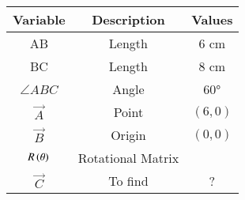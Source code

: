 
\begin{tabular}[12pt]{ |c| c| c|}
    \hline
    \textbf{Variable} & \textbf{Description} & \textbf{Values} \\ 
    \hline
    AB & Length & 6 cm \\
    \hline
    BC & Length & 8 cm \\
    \hline
    $\angle ABC$ & Angle & \ang{60}\\
    \hline 
    $\vec{A}$ & Point & $(6,0)$ \\
    \hline
    $\vec{B}$ & Origin & $(0,0)$ \\
    \hline
    $R \left(\theta\right)$ & Rotational Matrix &  \\
    \hline
    $\vec{C}$ & To find & ? \\
    \hline
    \end{tabular}

